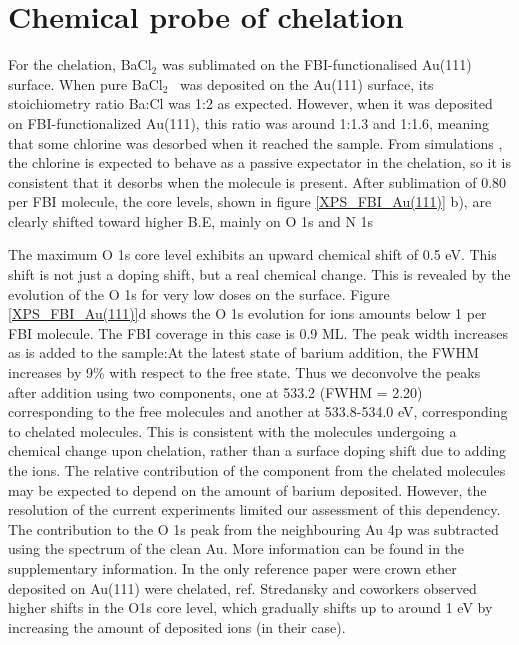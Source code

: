 \documentclass[aps,prl,reprint,longbibliography,superscriptaddress, english]{revtex4-1}
\def\BappCl{BaCl$_2$ }
\newcommand{\completar}[1]{{\color{red} #1}}
\begin{document}
\section{Chemical probe of chelation}
For the chelation, \BappCl was sublimated on the FBI-functionalised Au(111) surface. When pure \BappCl\ was deposited on the Au(111) surface, its stoichiometry ratio Ba:Cl was 1:2 as expected. \completar{However, when it was deposited on FBI-functionalized Au(111), this ratio was around 1:1.3 and 1:1.6, meaning that some chlorine was desorbed when it reached the sample. From simulations \cite{rivilla_fluorescent_2020}, the chlorine is expected to behave as a passive expectator in the chelation, so it is consistent that it desorbs when the molecule is present.}
After sublimation of 0.80 \Bapp per FBI molecule, the core levels, shown in figure \ref{XPS_FBI_Au(111)} b), are clearly shifted toward higher B.E, mainly on O 1s and N 1s

The maximum O 1s core level exhibits an upward chemical shift of 0.5 eV. This shift is not just a doping shift, but a real chemical change. This is revealed by the evolution of the O 1s for very low \Bapp doses on the surface. Figure \ref{XPS_FBI_Au(111)}d shows the O 1s evolution for \Bapp ions amounts below 1 \Bapp per FBI molecule. The FBI coverage in this case is 0.9 ML. The peak width increases as \Bapp is  added to the sample:At the latest state of barium addition, the FWHM increases by 9\% with respect to the free state. Thus we deconvolve the peaks after \Bapp addition using two components, one at 533.2 (FWHM = 2.20) corresponding to the free molecules and another at 533.8-534.0 eV, corresponding to chelated molecules.   This is consistent with the molecules undergoing a chemical change upon chelation, rather than a surface doping shift due to adding the ions. \completar{The relative contribution of the component from the chelated molecules may be expected to depend on the amount of barium deposited. However, the resolution of the current experiments limited our assessment of this dependency}. The contribution to the O 1s peak from the neighbouring Au 4p was subtracted using the spectrum of the clean Au. More information can be found in the supplementary information.
In the only reference paper were crown ether deposited on Au(111) were chelated, ref. \cite{stredansky_-surface_2019} Stredansky and coworkers observed higher shifts in the O1s core level, which gradually shifts up to around 1 eV by increasing the amount of deposited ions (\Nap in their case). %
\end{document}
